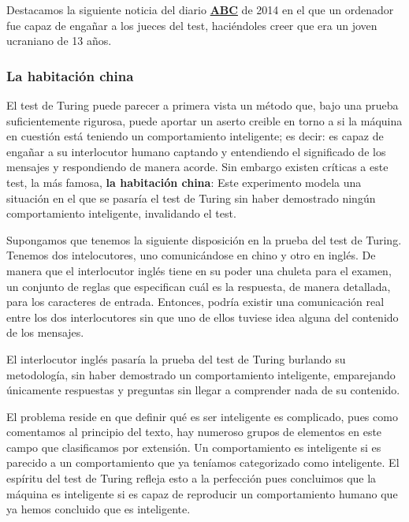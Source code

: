 \vspace{10px}

Destacamos la siguiente noticia del diario \href{https://www.abc.es/ciencia/20140609/abci-superordenador-supera-primera-test-201406091139.html}{\textbf{ABC}} de 2014 en el que un ordenador fue capaz de engañar a los jueces del test, haciéndoles creer que era un joven ucraniano de 13 años.


\subsubsection{La habitación china}

El test de Turing puede parecer a primera vista un método que, bajo una prueba suficientemente rigurosa, puede aportar un aserto creible en torno a si la máquina en cuestión está teniendo un comportamiento inteligente; es decir: es capaz de engañar a su interlocutor humano captando y entendiendo el significado de los mensajes y respondiendo de manera acorde. Sin embargo existen críticas a este test, la más famosa, \textbf{la habitación china}: Este experimento modela una situación en el que se pasaría el test de Turing sin haber demostrado ningún comportamiento inteligente, invalidando el test.

Supongamos que tenemos la siguiente disposición en la prueba del test de Turing. Tenemos dos intelocutores, uno comunicándose en chino y otro en inglés. De manera que el interlocutor inglés tiene en su poder una chuleta para el examen, un conjunto de reglas que especifican cuál es la respuesta, de manera detallada, para los caracteres de entrada. Entonces, podría existir una comunicación real entre los dos interlocutores sin que uno de ellos tuviese idea alguna del contenido de los mensajes.

\vspace{10px}

El interlocutor inglés pasaría la prueba del test de Turing burlando su metodología, sin haber demostrado un comportamiento inteligente, emparejando únicamente respuestas y preguntas sin llegar a comprender nada de su contenido.

\vspace{10px}

El problema reside en que definir qué es ser inteligente es complicado, pues como comentamos al principio del texto, hay numeroso grupos de elementos en este campo que clasificamos por extensión. Un comportamiento es inteligente si es parecido a un comportamiento que ya teníamos categorizado como inteligente. El espíritu del test de Turing refleja esto a la perfección pues concluimos que la máquina es inteligente si es capaz de reproducir un comportamiento humano que ya hemos concluido que es inteligente. 

